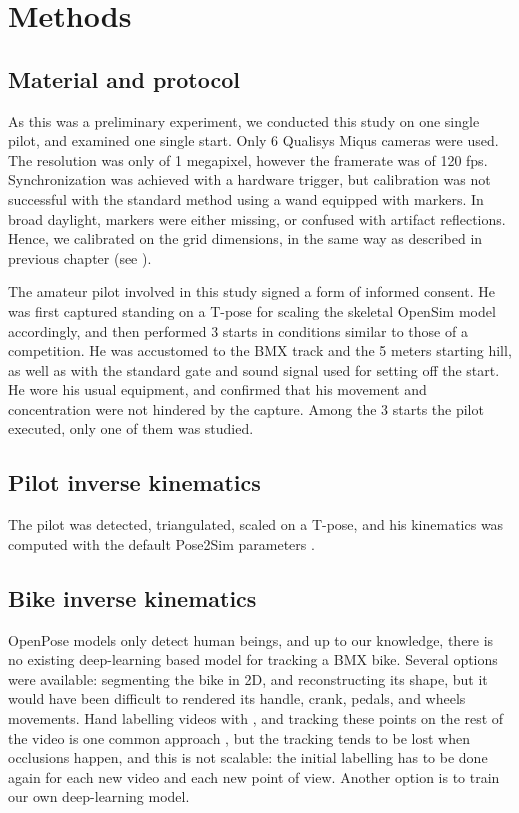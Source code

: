 \section{Methods}

\subsection{Material and protocol}
As this was a preliminary experiment, we conducted this study on one single pilot, and examined one single start. Only 6 Qualisys Miqus cameras were used. The resolution was only of 1 megapixel, however the framerate was of 120 fps. Synchronization was achieved with a hardware trigger, but calibration was not successful with the standard method using a wand equipped with markers. In broad daylight, markers were either missing, or confused with artifact reflections. Hence, we calibrated on the grid dimensions, in the same way as described in previous chapter (see ). 

The amateur pilot involved in this study signed a form of informed consent. He was first captured standing on a T-pose for scaling the skeletal OpenSim model accordingly, and then performed 3 starts in conditions similar to those of a competition. He was accustomed to the BMX track and the 5 meters starting hill, as well as with the standard gate and sound signal used for setting off the start. He wore his usual equipment, and confirmed that his movement and concentration were not hindered by the capture. Among the 3 starts the pilot executed, only one of them was studied. 


\subsection{Pilot inverse kinematics}
The pilot was detected, triangulated, scaled on a T-pose, and his kinematics was computed with the default Pose2Sim parameters \cite{Pagnon2022b}. 


\subsection{Bike inverse kinematics}
OpenPose models only detect human beings, and up to our knowledge, there is no existing deep-learning based model for tracking a BMX bike. Several options were available: segmenting the bike in 2D, and reconstructing its shape, but it would have been difficult to rendered its handle, crank, pedals, and wheels movements. Hand labelling videos with \cite{Kinovea}, and tracking these points on the rest of the video is one common approach \cite{Grigg2018}, but the tracking tends to be lost when occlusions happen, and this is not scalable: the initial labelling has to be done again for each new video and each new point of view. Another option is to train our own deep-learning model.

